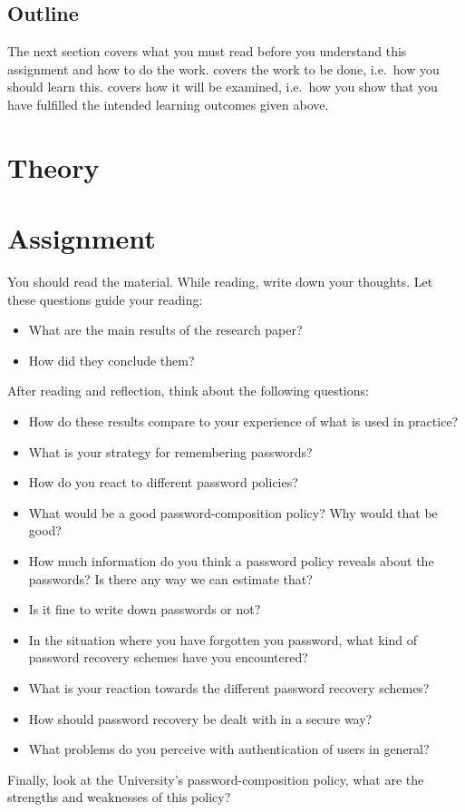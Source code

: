 \subsection{Outline}

The next section covers what you must read before you understand this 
assignment and how to do the work.
 covers the work to be done, i.e.~how you should learn this.
 covers how it will be examined, i.e.~how you show that you have 
fulfilled the intended learning outcomes given above.


\section{Theory}%
\label{sec:theory}




\section{Assignment}%
\label{sec:tasks}

You should read the material.
While reading, write down your thoughts.
Let these questions guide your reading:
\begin{itemize}
  \item What are the main results of the research paper?
  \item How did they conclude them?
\end{itemize}
After reading and reflection, think about the following questions:
\begin{itemize}
  \item How do these results compare to your experience of what is used in 
    practice?
  \item What is your strategy for remembering passwords?
  \item How do you react to different password policies?
  \item What would be a good password-composition policy?
    Why would that be good?
  \item How much information do you think a password policy reveals about the 
    passwords?
    Is there any way we can estimate that?
  \item Is it fine to write down passwords or not?
  \item In the situation where you have forgotten you password,
  	what kind of password recovery schemes have you encountered?
  \item What is your reaction towards the different password recovery schemes?  
  \item How should password recovery be dealt with in a secure way?
  \item What problems do you perceive with authentication of users in general?
\end{itemize}
Finally, look at the University's password-composition policy, what are the 
strengths and weaknesses of this policy?

